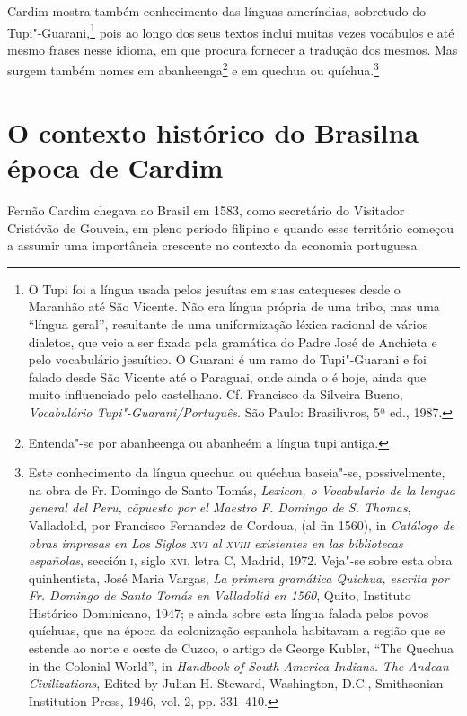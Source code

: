 Cardim mostra também conhecimento das línguas ameríndias, sobretudo
do Tupi"-Guarani,\footnote{ O Tupi foi a língua usada pelos
jesuítas em suas catequeses desde o Maranhão até São Vicente. Não era
língua própria de uma tribo, mas uma ``língua geral'', resultante de uma
uniformização léxica racional de vários dialetos, que veio a ser
fixada pela gramática do Padre José de Anchieta e pelo vocabulário
jesuítico. O Guarani é um ramo do Tupi"-Guarani e foi falado
desde São Vicente até o Paraguai, onde ainda o é hoje, ainda que muito
influenciado pelo castelhano. Cf. Francisco da Silveira Bueno,
\textit{Vocabulário Tupi"-Guarani/Português}. São Paulo: Brasilivros, 
5ª ed., 1987.} pois ao longo dos seus textos inclui muitas 
vezes vocábulos e até mesmo frases nesse idioma, em que procura
fornecer a tradução dos mesmos. Mas surgem também nomes em
abanheenga\footnote{ Entenda"-se por abanheenga ou
abanheém a língua tupi antiga.} e em quechua ou 
quíchua.\footnote{ Este conhecimento da língua quechua ou
quéchua baseia"-se, possivelmente, na obra de Fr. Domingo de Santo
Tomás, \textit{Lexicon, o Vocabulario de la lengua general del Peru,
cõpuesto por el Maestro F. Domingo de S. Thomas}, Valladolid, por
Francisco Fernandez de Cordoua, (al fin 1560), in \textit{Catálogo de
obras impresas en Los Siglos \textsc{xvi} al \textsc{xviii} existentes en las
bibliotecas españolas}, sección \textsc{i}, siglo \textsc{xvi}, letra C, Madrid, 1972.
Veja"-se sobre esta obra quinhentista, José Maria Vargas, \textit{La
primera gramática Quichua, escrita por Fr. Domingo de Santo Tomás en
Valladolid en 1560}, Quito, Instituto Histórico Dominicano, 1947; e
ainda sobre esta língua falada pelos povos quíchuas, que na época 
da colonização espanhola habitavam a região que se estende ao
norte e oeste de Cuzco, o artigo de George Kubler, ``The Quechua in the
Colonial World'', in \textit{Handbook of South America Indians.}
\textit{The Andean Civilizations}, Edited by Julian H. Steward,
Washington, D.C., Smithsonian Institution Press, 1946, vol. 2, pp. 331--410.}

\section{O contexto histórico do Brasil\break na época de Cardim} 

Fernão Cardim chegava ao Brasil em 1583, como secretário do Visitador
Cristóvão de Gouveia, em pleno período filipino e quando esse território 
começou a assumir uma importância crescente no contexto da economia portuguesa. 

